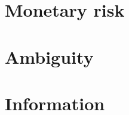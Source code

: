 \documentclass[11pt,letterpaper,reqno,oneside]{book}
\begin{document}




\chapter{Monetary risk}
\label{ch_mone}





\chapter{Ambiguity}
\label{ch_ambi}





\chapter{Information}
\label{ch_info}









\end{document}
